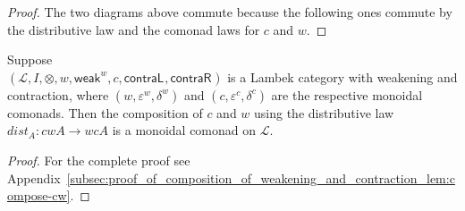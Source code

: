 \documentclass[a4paper,UKenglish]{lipics-v2016}
\let\mto\to
\let\to\relax
\newcommand{\to}{\rightarrow}
\newcommand{\cat}[1]{\mathcal{#1}}
\newcommand{\w}[1]{\mathsf{weak}_{#1}}
\newcommand{\cL}[1]{\mathsf{contraL}_{#1}}
\newcommand{\cR}[1]{\mathsf{contraR}_{#1}}
\begin{document}
\begin{proof}
  The two diagrams above commute because the following ones commute by the
  distributive law and the comonad laws for $c$ and $w$.
\end{proof}

\begin{lemma}
  \label{lem:compose-cw}
  Suppose \\ $(\cat{L},I,\otimes,w,\w{}^w,c,\cL{},\cR{})$ is a Lambek
  category with weakening and contraction, where
  $(w,\varepsilon^w,\delta^w)$ and $(c,\varepsilon^c,\delta^c)$ are
  the respective monoidal comonads. Then the composition of $c$ and
  $w$ using the distributive law $dist_A:cwA\mto wcA$ is a monoidal
  comonad on $\cat{L}$.
\end{lemma}
\begin{proof}
  For the complete proof see
  Appendix~\ref{subsec:proof_of_composition_of_weakening_and_contraction_lem:compose-cw}.
\end{proof}
\end{document}
